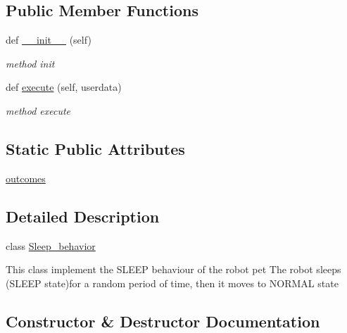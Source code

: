 \subsection*{Public Member Functions}
\begin{DoxyCompactItemize}
\item 
def \hyperlink{classbehavior__manager_1_1Sleep__behavior_a778df3c5a36999ef4792e6ac444bd7f3}{\+\_\+\+\_\+init\+\_\+\+\_\+} (self)
\begin{DoxyCompactList}\small\item\em method init \end{DoxyCompactList}\item 
def \hyperlink{classbehavior__manager_1_1Sleep__behavior_a02d87859cb76d2dbdf78d9d6e2452782}{execute} (self, userdata)
\begin{DoxyCompactList}\small\item\em method execute \end{DoxyCompactList}\end{DoxyCompactItemize}
\subsection*{Static Public Attributes}
\begin{DoxyCompactItemize}
\item 
\hyperlink{classbehavior__manager_1_1Sleep__behavior_a93f2d2ae5c3444c803d62ead8dd079b2}{outcomes}
\end{DoxyCompactItemize}


\subsection{Detailed Description}
class \hyperlink{classbehavior__manager_1_1Sleep__behavior}{Sleep\+\_\+behavior} 

This class implement the S\+L\+E\+EP behaviour of the robot pet The robot sleeps (S\+L\+E\+EP state)for a random period of time, then it moves to N\+O\+R\+M\+AL state 

\subsection{Constructor \& Destructor Documentation}
